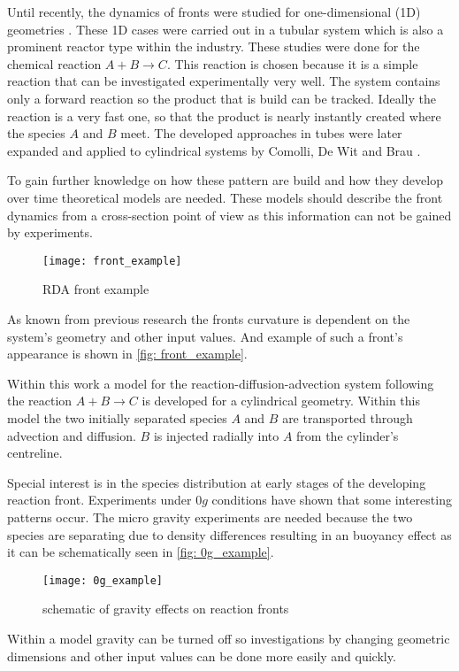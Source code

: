 \documentclass[../thesis.tex]{subfiles}
\begin{document}
Until recently, the dynamics of fronts were studied for one-dimensional (1D) geometries \cite{PhysRevA.38.3151}. These 1D cases were carried out in a tubular system which is also a prominent reactor type within the industry. These studies were done for the chemical reaction $ A+B \rightarrow C$. This reaction is chosen because it is a simple reaction that can be investigated experimentally very well. The system contains only a forward reaction so the product that is build can be tracked. Ideally the reaction is a very fast one, so that the product is nearly instantly created where the species $A$ and $B$ meet. The developed approaches in tubes were later expanded and applied to cylindrical systems by Comolli, De Wit and Brau \cite{comolli2021dynamics}.

To gain further knowledge on how these pattern are build and how they develop over time theoretical models are needed. These models should describe the front dynamics from a cross-section point of view as this information can not be gained by experiments. 
\begin{figure}[htbp]
	\centering
	\texttt{[image: front\_example]}
	\caption{RDA front example}
	\label{fig: front_example}
\end{figure}
As known from previous research the fronts curvature is dependent on the system's geometry and other input values. And example of such a front's appearance is shown in \autoref{fig: front_example}.

Within this work a model for the reaction-diffusion-advection system following the reaction $ A+B \rightarrow C$ is developed for a cylindrical geometry. Within this model the two initially separated species $A$ and $B$ are transported through advection and diffusion. $B$ is injected radially into $A$ from the cylinder's centreline. 

Special interest is in the species distribution at early stages of the developing reaction front. Experiments under $0g$ conditions have shown that some interesting patterns occur. The micro gravity experiments are needed because the two species are separating due to density differences resulting in an buoyancy effect as it can be schematically seen in \autoref{fig: 0g_example}.
\begin{figure}[htbp]
	\centering
	\texttt{[image: 0g\_example]}
	\caption{schematic of gravity effects on reaction fronts \cite{stergiou2022effects}}
	\label{fig: 0g_example}
\end{figure}
Within a model gravity can be turned off so investigations by changing geometric dimensions and other input values can be done more easily and quickly.
\end{document}

